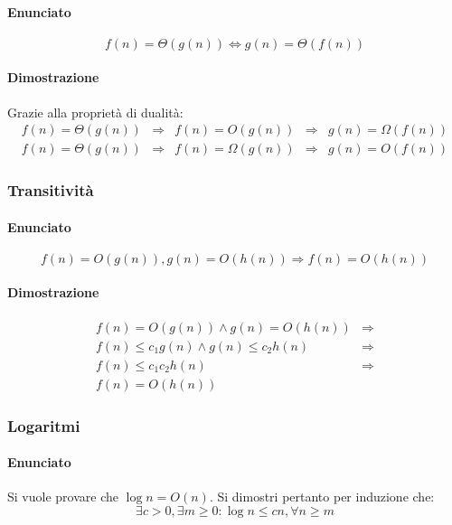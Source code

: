 \paragraph{Enunciato}
\begin{equation*}
f(n)=\Theta(g(n))\Leftrightarrow g(n)=\Theta(f(n))
\end{equation*}
\paragraph{Dimostrazione}
Grazie alla propriet\`a di dualit\`a:
\begin{align*}
f(n)=\Theta(g(n))&\Rightarrow & f(n)=O(g(n)) &\Rightarrow & g(n)=\Omega(f(n))\\
f(n)=\Theta(g(n))&\Rightarrow & f(n)=\Omega(g(n)) &\Rightarrow & g(n)=O(f(n))
\end{align*}
\subsubsection{Transitivit\`a}
\paragraph{Enunciato}
\begin{equation*}
f(n)=O(g(n)), g(n)=O(h(n))\Rightarrow f(n)=O(h(n))
\end{equation*}
\paragraph{Dimostrazione}
\begin{align*}
f(n)=O(g(n))\land g(n)=O(h(n))&\Rightarrow\\
f(n)\le c_1g(n)\land g(n)\le c_2h(n)&\Rightarrow\\
f(n)\le c_1c_2h(n)&\Rightarrow\\
f(n)=O(h(n))&
\end{align*}
\subsubsection{Logaritmi}
\paragraph{Enunciato}
Si vuole provare che $\log n=O(n)$. Si dimostri pertanto per induzione che:
\begin{equation*}
\exists c>0, \exists m\ge 0: \log n\le cn,\forall n\ge m
\end{equation*}

